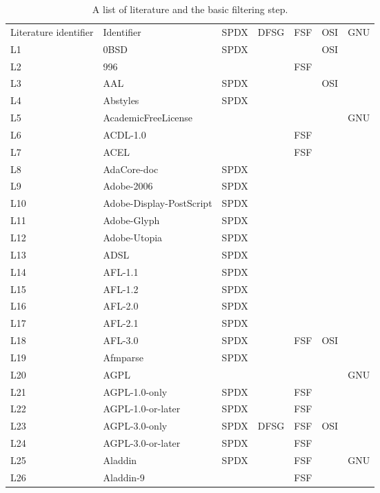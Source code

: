 
\begin{longtable}[h]{m{2cm} | m{7cm} | c | c | c | c | c}
  \caption{A list of literature and the basic filtering step.} \label{table:appendix:a} \\
  \hline
  Literature identifier & Identifier & SPDX & DFSG & FSF & OSI & GNU \\
  L1 & 0BSD & SPDX &  &  & OSI &  \\
  L2 & 996 &  &  & FSF &  &  \\
  L3 & AAL & SPDX &  &  & OSI &  \\
  L4 & Abstyles & SPDX &  &  &  &  \\
  L5 & AcademicFreeLicense &  &  &  &  & GNU \\
  L6 & ACDL-1.0 &  &  & FSF &  &  \\
  L7 & ACEL &  &  & FSF &  &  \\
  L8 & AdaCore-doc & SPDX &  &  &  &  \\
  L9 & Adobe-2006 & SPDX &  &  &  &  \\
  L10 & Adobe-Display-PostScript & SPDX &  &  &  &  \\
  L11 & Adobe-Glyph & SPDX &  &  &  &  \\
  L12 & Adobe-Utopia & SPDX &  &  &  &  \\
  L13 & ADSL & SPDX &  &  &  &  \\
  L14 & AFL-1.1 & SPDX &  &  &  &  \\
  L15 & AFL-1.2 & SPDX &  &  &  &  \\
  L16 & AFL-2.0 & SPDX &  &  &  &  \\
  L17 & AFL-2.1 & SPDX &  &  &  &  \\
  L18 & AFL-3.0 & SPDX &  & FSF & OSI &  \\
  L19 & Afmparse & SPDX &  &  &  &  \\
  L20 & AGPL &  &  &  &  & GNU \\
  L21 & AGPL-1.0-only & SPDX &  & FSF &  &  \\
  L22 & AGPL-1.0-or-later & SPDX &  & FSF &  &  \\
  L23 & AGPL-3.0-only & SPDX & DFSG & FSF & OSI &  \\
  L24 & AGPL-3.0-or-later & SPDX &  & FSF &  &  \\
  L25 & Aladdin & SPDX &  & FSF &  & GNU \\
  L26 & Aladdin-9 &  &  & FSF &  &  \\

\end{longtable}
